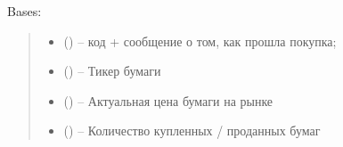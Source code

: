 \documentclass[letterpaper,10pt,english,openany,oneside]{sphinxmanual}
\begin{document}

\begin{fulllineitems}
\label{\detokenize{src.structures:src.structures.st_purchase.StockPurchaseResponse}}
\pysigstartsignatures
{}
\pysigstopsignatures
\sphinxAtStartPar
Bases: 

\begin{fulllineitems}
\label{\detokenize{src.structures:src.structures.st_purchase.StockPurchaseResponse.__init__}}
\pysigstartsignatures
{}
\pysigstopsignatures\begin{quote}\begin{description}
\begin{itemize}
\item {} 
\sphinxAtStartPar
{} ({\hyperref[\detokenize{src.structures:src.structures.st_purchase.DataMessage}]{}}) – код + сообщение о том, как прошла покупка;

\item {} 
\sphinxAtStartPar
{} () – Тикер бумаги

\item {} 
\sphinxAtStartPar
{} () – Актуальная цена бумаги на рынке

\item {} 
\sphinxAtStartPar
{} () – Количество купленных / проданных бумаг


\end{itemize}
\end{description}
\end{quote}
\end{fulllineitems}
\end{fulllineitems}
\end{document}
